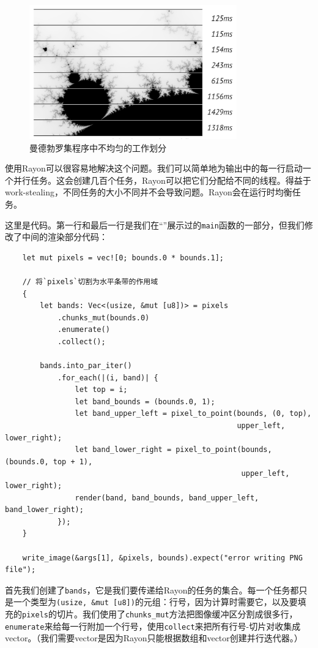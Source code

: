 \begin{figure}[htbp]
    \centering
    \includegraphics[width=0.8\textwidth]{../img/f19-4.png}
    \caption{曼德勃罗集程序中不均匀的工作划分}
    \label{f19-4}
\end{figure}

使用Rayon可以很容易地解决这个问题。我们可以简单地为输出中的每一行启动一个并行任务。这会创建几百个任务，Rayon可以把它们分配给不同的线程。得益于work-stealing，不同任务的大小不同并不会导致问题。Rayon会在运行时均衡任务。

这里是代码。第一行和最后一行是我们在“”展示过的\texttt{main}函数的一部分，但我们修改了中间的渲染部分代码：
\begin{verbatim}
    let mut pixels = vec![0; bounds.0 * bounds.1];

    // 将`pixels`切割为水平条带的作用域
    {
        let bands: Vec<(usize, &mut [u8])> = pixels
            .chunks_mut(bounds.0)
            .enumerate()
            .collect();
        
        bands.into_par_iter()
            .for_each(|(i, band)| {
                let top = i;
                let band_bounds = (bounds.0, 1);
                let band_upper_left = pixel_to_point(bounds, (0, top),
                                                     upper_left, lower_right);
                let band_lower_right = pixel_to_point(bounds, (bounds.0, top + 1),
                                                      upper_left, lower_right);
                render(band, band_bounds, band_upper_left, band_lower_right);
            });
    }

    write_image(&args[1], &pixels, bounds).expect("error writing PNG file");
\end{verbatim}

首先我们创建了\texttt{bands}，它是我们要传递给Rayon的任务的集合。每一个任务都只是一个类型为\texttt{(usize, \&mut [u8])}的元组：行号，因为计算时需要它，以及要填充的\texttt{pixels}的切片。我们使用了\texttt{chunks\_mut}方法把图像缓冲区分割成很多行，\texttt{enumerate}来给每一行附加一个行号，使用\texttt{collect}来把所有行号-切片对收集成vector。（我们需要vector是因为Rayon只能根据数组和vector创建并行迭代器。）

